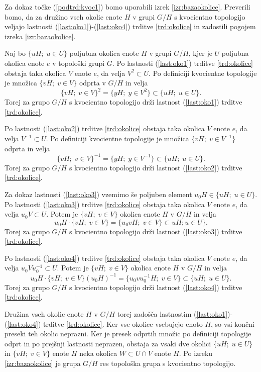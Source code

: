 \documentclass[mat1]{fmfdelo}
\begin{document}
\begin{dokaz}
Za dokaz točke (\ref{podtrd:kvoc1}) bomo uporabili izrek \ref{izr:bazaokolice}. Preverili bomo, da za družino vseh okolic enote $H$ v grupi $G/H$ s kvocientno topologijo veljajo lastnosti (\ref{last:oko1})-(\ref{last:oko4}) trditve \ref{trd:okolice} in zadostili pogojem izreka \ref{izr:bazaokolice}.

Naj bo $\lbrace uH ;\; u \in U \rbrace$ poljubna okolica enote $H$ v grupi $G/H$, kjer je $U$ poljubna okolica enote $e$ v topološki grupi $G$. Po lastnosti (\ref{last:oko1}) trditve \ref{trd:okolice} obstaja taka okolica $V$ enote $e$, da velja $V^2 \subset U$. Po definiciji kvocientne topologije je množica $\lbrace vH ;\; v \in V \rbrace$ odprta v $G/H$ in velja \[\lbrace vH ;\; v \in V \rbrace^2 = \lbrace yH ;\; y \in V^2 \rbrace \subset \lbrace uH ;\; u \in U \rbrace.\] Torej za grupo $G/H$ s kvocientno topologijo drži lastnost (\ref{last:oko1}) trditve \ref{trd:okolice}.

Po lastnosti (\ref{last:oko2}) trditve \ref{trd:okolice} obstaja taka okolica $V$ enote $e$, da velja $V^{-1} \subset U$. Po definiciji kvocientne topologije je množica $\lbrace vH ;\; v \in V^{-1} \rbrace$ odprta in velja \[\lbrace vH ;\; v \in V \rbrace^{-1} = \lbrace yH ;\; y \in V^{-1} \rbrace \subset \lbrace uH ;\; u \in U \rbrace.\] Torej za grupo $G/H$ s kvocientno topologijo drži lastnost (\ref{last:oko2}) trditve \ref{trd:okolice}.

Za dokaz lastnosti (\ref{last:oko3}) vzemimo še poljuben element $u_0H \in \lbrace uH ;\; u \in U \rbrace$. Po lastnosti (\ref{last:oko3}) trditve \ref{trd:okolice} obstaja taka okolica $V$ enote $e$, da velja $u_0V \subset U$. Potem je $\lbrace vH ;\; v \in V \rbrace$ okolica enote $H$ v $G/H$ in velja \[u_0H\cdot\lbrace vH ;\; v \in V\rbrace = \lbrace u_0vH ;\; v \in V \rbrace \subset uH ; u \in U \rbrace.\] Torej za grupo $G/H$ s kvocientno topologijo drži lastnost (\ref{last:oko3}) trditve \ref{trd:okolice}.

Po lastnosti (\ref{last:oko4}) trditve \ref{trd:okolice} obstaja taka okolica $V$ enote $e$, da velja $u_0Vu_0^{-1} \subset U$. Potem je $\lbrace vH ;\; v \in V \rbrace$ okolica enote $H$ v $G/H$ in velja
\[u_0H\cdot\lbrace vH ;\; v \in V\rbrace (u_0H)^{-1} = \lbrace u_0vu_0^{-1}H ;\; v \in V \rbrace \subset \lbrace uH ;\; u \in U \rbrace.\]
Torej za grupo $G/H$ s kvocientno topologijo drži lastnost (\ref{last:oko4}) trditve \ref{trd:okolice}.

Družina vseh okolic enote $H$ v $G/H$ torej zadošča lastnostim (\ref{last:oko1})-(\ref{last:oko4}) trditve \ref{trd:okolice}. Ker vse okolice vsebujejo enoto $H$, so vsi končni preseki teh okolic neprazni. Ker je presek odprtih množic po definiciji topologije odprt in po prejšnji lastnosti neprazen, obstaja za vsaki dve okolici $\lbrace uH ;\; u \in U \rbrace$ in $\lbrace vH ;\; v \in V \rbrace$ enote $H$ neka okolica $W \subset U \cap V$ enote $H$. Po izreku \ref{izr:bazaokolice} je grupa $G/H$ res topološka grupa s kvocientno topologijo.


\end{dokaz}
\end{document}
